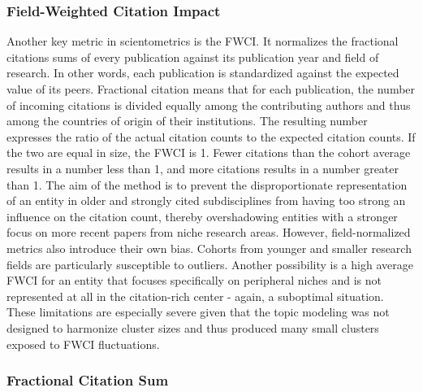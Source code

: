 \documentclass{article}
\begin{document}
	
	\subsubsection{Field-Weighted Citation Impact}
	
	Another key metric in scientometrics is the FWCI. It normalizes the fractional citations sums of every publication against its publication year and field of research. In other words, each publication is standardized against the expected value of its peers. Fractional citation means that for each publication, the number of incoming citations is divided equally among the contributing authors and thus among the countries of origin of their institutions. The resulting number expresses the ratio of the actual citation counts to the expected citation counts. If the two are equal in size, the FWCI is 1. Fewer citations than the cohort average results in a number less than 1, and more citations results in a number greater than 1. The aim of the method is to prevent the disproportionate representation of an entity in older and strongly cited subdisciplines from having too strong an influence on the citation count, thereby overshadowing entities with a stronger focus on more recent papers from niche research areas. However, field-normalized metrics also introduce their own bias. Cohorts from younger and smaller research fields are particularly susceptible to outliers. Another possibility is a high average FWCI for an entity that focuses specifically on peripheral niches and is not represented at all in the citation-rich center - again, a suboptimal situation. These limitations are especially severe given that the topic modeling was not designed to harmonize cluster sizes and thus produced many small clusters exposed to FWCI fluctuations.
	
	
	\subsubsection{Fractional Citation Sum}
	\label{fractional_citation_sum}
	
\end{document}
